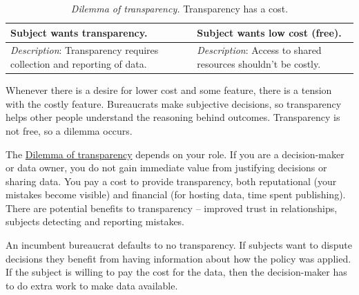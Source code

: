 \begin{center}
\begin{table}[H] %
\begin{tabular}{ | m{\dilemmatablewidth}| m{\dilemmatablewidth} | } 
  \hline
  \textbf{Subject wants transparency.} &
  \textbf{Subject wants low cost (free).} \\
  \hline
  \textit{Description}: Transparency requires collection and reporting of data. & 
  \textit{Description}: Access to shared resources shouldn't be costly. \\
  \hline
\end{tabular}
\caption{\textit{Dilemma of transparency.}
Transparency has a cost.
}
\label{table:dilemma-subject-transparency}
\end{table}
\end{center}

Whenever there is a desire for lower cost and some feature, there is a tension with the costly feature. Bureaucrats make subjective decisions, so transparency helps other people understand the reasoning behind outcomes. Transparency is not free, so a dilemma occurs. 


The \hyperref[table:dilemma-subject-transparency]{Dilemma of transparency} depends on your role. If you are a decision-maker or data owner, you do not gain immediate value from justifying decisions or sharing data. You pay a cost to provide transparency, both reputational (your mistakes become visible) and financial (for hosting data, time spent publishing). There are potential benefits to transparency -- improved trust in relationships, subjects detecting and reporting mistakes. 

An incumbent bureaucrat defaults to no transparency. If subjects want to dispute decisions they benefit from having information about how the policy was applied. If the subject is willing to pay the cost for the data, then the decision-maker has to do extra work to make data available.


